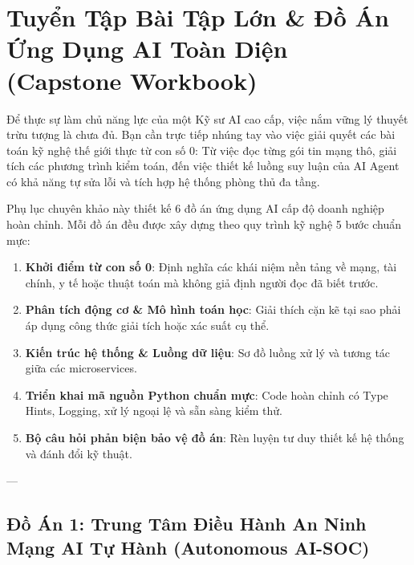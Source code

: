 
\chapter{Tuyển Tập Bài Tập Lớn \& Đồ Án Ứng Dụng AI Toàn Diện (Capstone Workbook)}
\label{ch:appendix-workbook}

Để thực sự làm chủ năng lực của một Kỹ sư AI cao cấp, việc nắm vững lý thuyết trừu tượng là chưa đủ. Bạn cần trực tiếp nhúng tay vào việc giải quyết các bài toán kỹ nghệ thế giới thực từ con số 0: Từ việc đọc từng gói tin mạng thô, giải tích các phương trình kiểm toán, đến việc thiết kế luồng suy luận của AI Agent có khả năng tự sửa lỗi và tích hợp hệ thống phòng thủ đa tầng.

Phụ lục chuyên khảo này thiết kế 6 đồ án ứng dụng AI cấp độ doanh nghiệp hoàn chỉnh. Mỗi đồ án đều được xây dựng theo quy trình kỹ nghệ 5 bước chuẩn mực:
\begin{enumerate}
  \item \textbf{Khởi điểm từ con số 0}: Định nghĩa các khái niệm nền tảng về mạng, tài chính, y tế hoặc thuật toán mà không giả định người đọc đã biết trước.
  \item \textbf{Phân tích động cơ \& Mô hình toán học}: Giải thích cặn kẽ tại sao phải áp dụng công thức giải tích hoặc xác suất cụ thể.
  \item \textbf{Kiến trúc hệ thống \& Luồng dữ liệu}: Sơ đồ luồng xử lý và tương tác giữa các microservices.
  \item \textbf{Triển khai mã nguồn Python chuẩn mực}: Code hoàn chỉnh có Type Hints, Logging, xử lý ngoại lệ và sẵn sàng kiểm thử.
  \item \textbf{Bộ câu hỏi phản biện bảo vệ đồ án}: Rèn luyện tư duy thiết kế hệ thống và đánh đổi kỹ thuật.
\end{enumerate}

---

\section{Đồ Án 1: Trung Tâm Điều Hành An Ninh Mạng AI Tự Hành (Autonomous AI-SOC)}
\label{sec:workbook-ai-soc}

